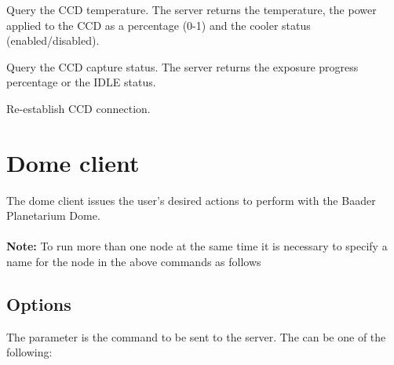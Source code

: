 \documentclass[a4paper,english]{article}
\begin{document}
\begin{Description}
\item[\Arg{gettemp}] Query the CCD temperature. The server returns the temperature, the power applied to the CCD as a percentage (0-1) and the cooler status (enabled/disabled).

	   
	
\item[\Arg{getcapstatus}] Query the CCD capture status. The server returns the exposure progress percentage or the IDLE status.

	   
	
\item[\Arg{reconnect}] Re-establish CCD connection.

	   
	
\end{Description}


\section{Dome client}

The dome client issues the user's desired actions to perform with the Baader Planetarium Dome. \\

   \\

\textbf{Note:} To run more than one  node at the same time it is necessary to specify a name for the node in the above commands as follows 


\subsection{Options}

The  parameter is the command to be sent to the server. The  can be one of the following:
\end{document}
